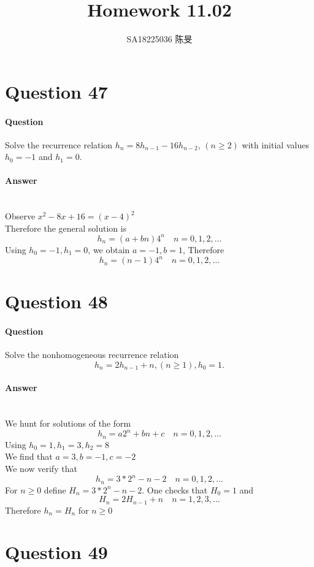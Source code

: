 \documentclass[UTF8]{article}
\title{Homework 11.02}
\author{SA18225036 陈旻}
\date{}
\begin{document}
\maketitle
\section{Question 47}
\paragraph{Question}
Solve the recurrence relation $ h_{n} = 8h_{n - 1} - 16h_{n - 2} $, $ (n \geq 2) $ with initial values $ h_{0} = -1 $ and $ h_{1} = 0 $.
\paragraph{Answer}
    ~\\
    Observe $ x^{2} - 8x + 16 = (x - 4)^{2} $ \\
    Therefore the general solution is
    $$ h_{n} = (a + bn)4^{n} \quad n = 0,1,2,\dots $$
    Using $ h_{0} = -1,h_{1} = 0 $, we obtain $ a = -1 , b = 1 $, Therefore
    $$ h_{n} = (n - 1)4^{n} \quad n = 0,1,2,\dots $$



\section{Question 48}
\paragraph{Question}
Solve the nonhomogeneous recurrence relation
$$ h_{n} = 2h_{n-1} + n , (n \geq 1) , h_{0} = 1.$$
\paragraph{Answer}
~\\
We hunt for solutions of the form
$$ h_{n} = a2^{n} + bn +c \quad n = 0,1,2,\dots $$
Using $ h_{0} = 1, h_{1} = 3, h_{2} = 8 $ \\
We find that $ a = 3, b = -1, c = -2 $ \\
We now verify that
$$ h_{n} = 3 * 2^{n} -n - 2 \quad n = 0,1,2, \dots $$
For $ n \geq 0 $ define $ H_{n} = 3 * 2^{n} - n - 2 $. One checks that $ H_{0} = 1 $ and
$$ H_{n} = 2H_{n - 1} + n \quad n = 1,2,3, \dots $$
Therefore $ h_{n} = H_{n} $ for $ n \geq 0 $
\section{Question 49}
\end{document}
